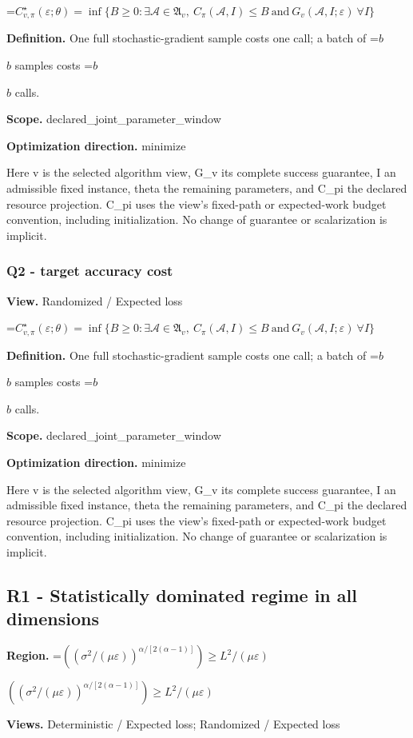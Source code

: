 \documentclass[10pt,a4paper]{article}
\newcommand{\AtlasMath}[1]{\par\begingroup\centering\setbox0=\hbox{$\displaystyle #1$}\ifdim\wd0>1.4\linewidth\typeout{ATLAS WIDE FORMULA: \the\wd0}\fi\ifdim\wd0>\linewidth\resizebox{\linewidth}{!}{\box0}\else\box0\fi\par\endgroup}
\newcommand{\AtlasInlineMath}[1]{\begingroup\setbox0=\hbox{$#1$}\ifdim\wd0>.4\linewidth\endgroup\AtlasMath{#1}\else\endgroup$#1$\fi}
\begin{document}
\AtlasMath{C^\star_{v,\pi}(\varepsilon;\theta)=\inf\{B\ge0:\exists\mathcal A\in\mathfrak A_v,\ C_\pi(\mathcal A,I)\le B\ \text{and}\ G_v(\mathcal A,I;\varepsilon)\ \forall I\}}
\textbf{Definition.} One full stochastic-gradient sample costs one call; a batch of \AtlasInlineMath{b} samples costs \AtlasInlineMath{b} calls.

\textbf{Scope.} declared\_joint\_parameter\_window

\textbf{Optimization direction.} minimize

Here v is the selected algorithm view, G\_v its complete success guarantee, I an admissible fixed instance, theta the remaining parameters, and C\_pi the declared resource projection. C\_pi uses the view's fixed-path or expected-work budget convention, including initialization. No change of guarantee or scalarization is implicit.

\subsubsection{Q2 - target accuracy cost}
\textbf{View.} Randomized / Expected loss

\AtlasMath{C^\star_{v,\pi}(\varepsilon;\theta)=\inf\{B\ge0:\exists\mathcal A\in\mathfrak A_v,\ C_\pi(\mathcal A,I)\le B\ \text{and}\ G_v(\mathcal A,I;\varepsilon)\ \forall I\}}
\textbf{Definition.} One full stochastic-gradient sample costs one call; a batch of \AtlasInlineMath{b} samples costs \AtlasInlineMath{b} calls.

\textbf{Scope.} declared\_joint\_parameter\_window

\textbf{Optimization direction.} minimize

Here v is the selected algorithm view, G\_v its complete success guarantee, I an admissible fixed instance, theta the remaining parameters, and C\_pi the declared resource projection. C\_pi uses the view's fixed-path or expected-work budget convention, including initialization. No change of guarantee or scalarization is implicit.

\subsection{R1 - Statistically dominated regime in all dimensions}
\textbf{Region.} \AtlasInlineMath{((\sigma^2/(\mu\varepsilon))^{\alpha/[2(\alpha-1)]})\ge L^2/(\mu\varepsilon)}

\textbf{Views.} Deterministic / Expected loss; Randomized / Expected loss
\end{document}
